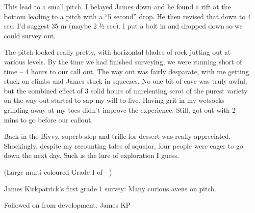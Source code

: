 This lead to a small pitch. I belayed James down and he found a rift at
the bottom leading to a pitch with a ``5 second'' drop. He then revised
that down to 4 sec. I'd suggest 35 m (maybe 2 ½ sec). I put a bolt in
and dropped down so we could survey out.


The  pitch looked really pretty, with horizontal
blades of rock jutting out at various levels. By the time we had
finished surveying, we were running short of time -- 4 hours to our call
out. The way out was fairly desparate, with me getting stuck on climbs
and James stuck in squeezes. No one bit of cave was truly awful, but the
combined effect of 3 solid hours of unrelenting scrot of the purest
variety on the way out started to sap my will to live. Having grit in my
wetsocks grinding away at my toes didn't improve the experience. Still,
got out with 2 mins to go before our callout.

Back in the Bivvy, superb slop and trifle for dessert was really
appreciated. Shockingly, despite my recounting tales of squalor, four
people were eager to go down the next day. Such is the lure of
exploration I guess.




(Large multi coloured Grade I of  - )

James Kirkpatrick's first grade 1 survey:  Many
curious avens on pitch.

Followed on from  development. James KP
